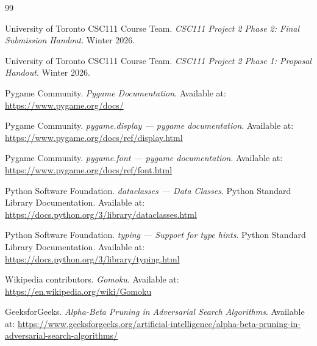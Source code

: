 \documentclass[11pt]{article}
\begin{document}
\begin{thebibliography}{99}

University of Toronto CSC111 Course Team.
\textit{CSC111 Project 2 Phase 2: Final Submission Handout}.
Winter 2026.

University of Toronto CSC111 Course Team.
\textit{CSC111 Project 2 Phase 1: Proposal Handout}.
Winter 2026.

Pygame Community.
\textit{Pygame Documentation}.
Available at: \url{https://www.pygame.org/docs/}

Pygame Community.
\textit{pygame.display --- pygame documentation}.
Available at: \url{https://www.pygame.org/docs/ref/display.html}

Pygame Community.
\textit{pygame.font --- pygame documentation}.
Available at: \url{https://www.pygame.org/docs/ref/font.html}

Python Software Foundation.
\textit{dataclasses --- Data Classes}.
Python Standard Library Documentation.
Available at: \url{https://docs.python.org/3/library/dataclasses.html}

Python Software Foundation.
\textit{typing --- Support for type hints}.
Python Standard Library Documentation.
Available at: \url{https://docs.python.org/3/library/typing.html}

Wikipedia contributors.
\textit{Gomoku}.
Available at: \url{https://en.wikipedia.org/wiki/Gomoku}

GeeksforGeeks.
\textit{Alpha-Beta Pruning in Adversarial Search Algorithms}.
Available at: \url{https://www.geeksforgeeks.org/artificial-intelligence/alpha-beta-pruning-in-adversarial-search-algorithms/}

\end{thebibliography}
\end{document}
